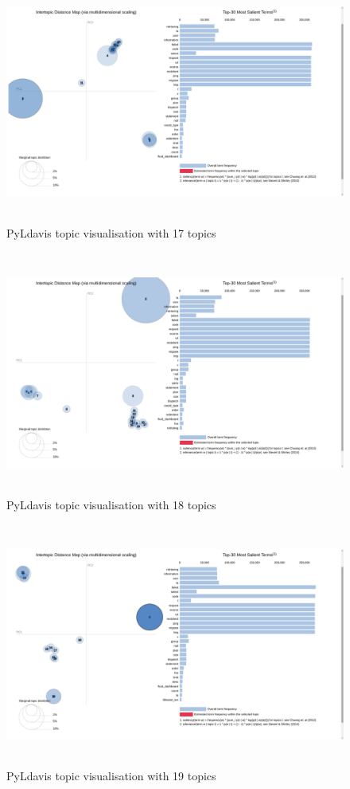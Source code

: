  \begin{figure}[!h]
    \centering
    \includegraphics[width=15cm, height=8cm,trim=0 0 100px 0, clip=true]{figures/pyldavis/pyldavis_17.png}
    \caption{PyLdavis topic visualisation with 17 topics}
    \label{fig:pyldavis_17}
\end{figure}

 \begin{figure}[!h]
    \centering
    \includegraphics[width=15cm, height=8cm,trim=0 0 100px 0, clip=true]{figures/pyldavis/pyldavis_18.png}
    \caption{PyLdavis topic visualisation with 18 topics}
    \label{fig:pyldavis_18}
\end{figure}

 \begin{figure}[!h]
    \centering
    \includegraphics[width=15cm, height=8cm,trim=0 0 100px 0, clip=true]{figures/pyldavis/pyldavis_19.png}
    \caption{PyLdavis topic visualisation with 19 topics}
    \label{fig:pyldavis_19}
\end{figure}

